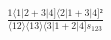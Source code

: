 \documentclass[varwidth, border=5pt]{standalone}
\begin{document}
\begin{my}
$\begin{gathered}
\scriptscriptstyle\frac{1⟨1|2+3|4]⟨2|1+3|4]²}{⟨12⟩⟨13⟩⟨3|1+2|4]s_{123}}
\end{gathered}$
\end{my}
\end{document}
